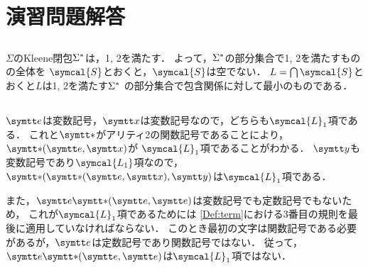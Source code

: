 \chapter{演習問題解答} \label{chap:answer}

\section*{}

\subsection*{}

\(\Sigma\)のKleene閉包\({\Sigma}^{\ast}\)は，1, 2を満たす．
よって，\({\Sigma}^{\ast}\)の部分集合で1, 2を満たすものの全体を
\(\symcal{S}\)とおくと，\(\symcal{S}\)は空でない．
\(L = \bigcap \symcal{S}\)とおくと\(L\)は1, 2を満たす\({\Sigma}^{\ast}\)
の部分集合で包含関係に対して最小のものである．

\section*{}

\subsection*{} \label{answer:termexample}

\(\obj{e}\)は変数記号，\(\obj{x}\)は変数記号なので，どちらも\(\symcal{L}_1\)項である．
これと\(\obj{\ast}\)がアリティ2の関数記号であることにより，\(\apply{\obj{\ast}}{\obj{e}, \obj{x}}\)が
\(\symcal{L}_1\)項であることがわかる．
\(\obj{y}\)も変数記号であり\(\symcal{L_1}\)項なので，
\(\apply{\obj{\ast}}{\apply{\obj{\ast}}{\obj{e}, \obj{x}}, \obj{y}}\)は\(\symcal{L}_1\)項である．

また，\(\obj{e}\apply{\mathord{\obj{\ast}}}{\obj{e}, \obj{e}}\)は変数記号でも定数記号でもないため，
これが\(\symcal{L}_1\)項であるためには
\cref{Def:term}における3番目の規則を最後に適用していなければならない．
このとき最初の文字は関数記号である必要があるが，\(\obj{e}\)は定数記号であり関数記号ではない．
従って，\(\obj{e}\apply{\mathord{\obj{\ast}}}{\obj{e}, \obj{e}}\)は\(\symcal{L}_1\)項ではない．

\subsection*{}

